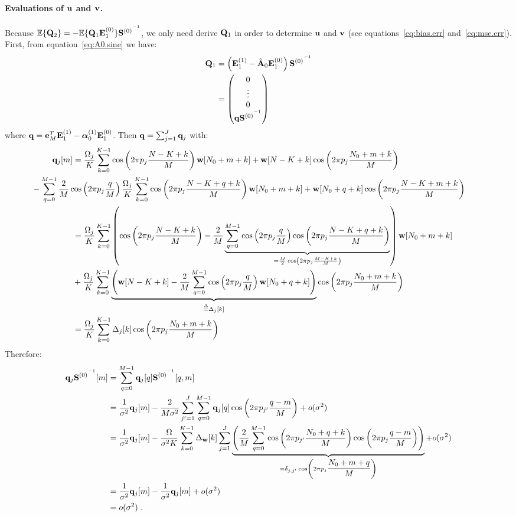 \paragraph{Evaluations of ${\mathbf u}$ and ${\mathbf v}$.}
Because ${\mathbb E}\{{\mathbf Q}_2\} =  - {\mathbb E}\{{\mathbf Q}_1{\mathbf E}^{(0)}_1\}{{\mathbf S}^{(0)}}^{^{-1}}$, we only need derive ${\mathbf Q}_1$ in order to determine ${\mathbf u}$ and ${\mathbf v}$ (see equations~\eqref{eq:bias.err} and~\eqref{eq:mse.err}). First, from equation~\eqref{eq:A0.sine} we have:
\begin{align*}
{\mathbf Q}_1 &= \left( {\mathbf E}^{(1)}_1- \tilde{{\mathbf A}}_0{\mathbf E}_1^{(0)} \right){{\mathbf S}^{(0)}}^{^{-1}} \\
&= 
\begin{pmatrix}
0 \\
\vdots \\
0 \\
{\mathbf q}{{\mathbf S}^{(0)}}^{^{-1}}
\end{pmatrix}
\end{align*}
where ${\mathbf q} = {\mathbf e}_M^T{\mathbf E}^{(1)}_1- \boldsymbol{\alpha}^{(1)}_0{\mathbf E}_1^{(0)}$. Then ${\mathbf q} = \sum_{j=1}^J{\mathbf q}_{j}$ with:
\begin{align*}
\bq_j[m] &= \dfrac{\Omega_j}K\sum_{k=0}^{K-1} \cos\left(2\pi p_j\dfrac{N-K+k}{M} \right)\bw[N_0+m+k] + \bw[N-K+k]\cos\left(2\pi p_j\dfrac{N_0+m+k}{M} \right) \\
& \hspace{-50pt}- \sum_{q=0}^{M-1}\dfrac{2}{M}\cos\left(2\pi p_j\dfrac{q}{M}\right)\dfrac{\Omega_j}K\sum_{k=0}^{K-1} \cos\left(2\pi p_j\dfrac{N-K+q+k}{M} \right)\bw[N_0+m+k] + \bw[N_0+q+k]\cos\left(2\pi p_j\dfrac{N-K+m+k}{M} \right) \\
&= \dfrac{\Omega_j}K\sum_{k=0}^{K-1} \left( \cos\left(2\pi p_j\dfrac{N-K+k}{M} \right) - \dfrac{2}{M}\underbrace{\sum_{q=0}^{M-1}\cos\left(2\pi p_j\dfrac{q}{M}\right) \cos\left(2\pi p_j\dfrac{N-K+q+k}{M} \right)}_{=\frac{M}{2}\cos\left(2\pi p_j \frac{M-K+k}{M}\right)} \right)\bw[N_0+m+k] \\
& +\dfrac{\Omega_j}K\sum_{k=0}^{K-1} \underbrace{\left(\bw[N-K+k]-\dfrac{2}{M}\sum_{q=0}^{M-1}\cos\left(2\pi p_j\dfrac{q}{M}\right)\bw[N_0+q+k]\right)}_{\defeq\Delta_j[k]} \cos\left(2\pi p_j\dfrac{N_0+m+k}{M} \right) \\
&= \dfrac{\Omega_j}K\sum_{k=0}^{K-1} \Delta_j[k] \cos\left(2\pi p_j\dfrac{N_0+m+k}{M} \right)
\end{align*}
Therefore:
\begin{align*}
{\mathbf q}_j{{\mathbf S}^{(0)}}^{^{-1}}[m] &= \sum_{q=0}^{M-1} {\mathbf q}_j[q]{{\mathbf S}^{(0)}}^{^{-1}}[q,m] \\
&= \dfrac1{\sigma^2}{\mathbf q}_j[m]-\dfrac{2}{M\sigma^2}\sum_{j'=1}^J\sum_{q=0}^{M-1} {\mathbf q}_j[q]\cos\left(2\pi p_{j'}\dfrac{q-m}{M}\right) + o(\sigma^2) \\
&= \dfrac1{\sigma^2}{\mathbf q}_j[m]-\dfrac{\Omega}{\sigma^2K}\sum_{k=0}^{K-1}\Delta_{\mathbf w}[k]\sum_{j=1}^J \underbrace{\left(\dfrac2M\sum_{q=0}^{M-1} \cos\left(2\pi p_{j'}\dfrac{N_0+q+k}{M}\right)\cos\left(2\pi p_j\dfrac{q-m}{M}\right) \right)}_{=\delta_{j,j'}\cos\left(2\pi p_j\dfrac{N_0+m+q}{M}\right)}+ o(\sigma^2) \\
&= \dfrac1{\sigma^2}{\mathbf q}_j[m]-\dfrac1{\sigma^2}{\mathbf q}_j[m]+ o(\sigma^2) \\
&= o(\sigma^2)\ .
\end{align*}

